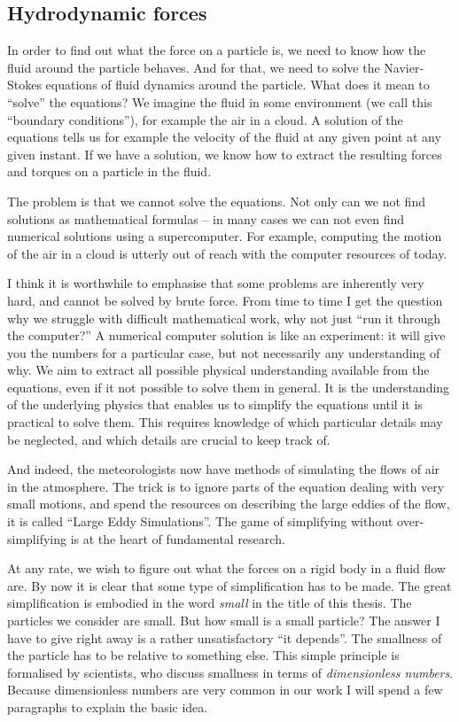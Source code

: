 \documentclass[thesis.tex]{subfiles}
\begin{document}
\subsection*{Hydrodynamic forces}

In order to find out what the force on a particle is, we need to know how the fluid around the particle behaves. And for that, we need to solve the Navier-Stokes equations of fluid dynamics around the particle. What does it mean to ``solve'' the equations? We imagine the fluid in some environment (we call this ``boundary conditions''), for example the air in a cloud. A solution of the equations tells us for example the velocity of the fluid at any given point at any given instant. If we have a solution, we know how to extract the resulting forces and torques on a particle in the fluid.

The problem is that we cannot solve the equations. Not only can we not find solutions as mathematical formulas -- in many cases we can not even find numerical solutions using a supercomputer. For example, computing the motion of the air in a cloud is utterly out of reach with the computer resources of today.

I think it is worthwhile to emphasise that some problems are inherently very hard, and cannot be solved by brute force. From time to time I get the question why we struggle with difficult mathematical work, why not just ``run it through the computer?'' A numerical computer solution is like an experiment: it will give you the numbers for a particular case, but not necessarily any understanding of why. We aim to extract all possible physical understanding available from the equations, even if it not possible to solve them in general. It is the understanding of the underlying physics that enables us to simplify the equations until it is practical to solve them. This requires knowledge of which particular details may be neglected, and which details are crucial to keep track of. 

And indeed, the meteorologists now have methods of simulating the flows of air in the atmosphere. The trick is to ignore parts of the equation dealing with very small motions, and spend the resources on describing the large eddies of the flow, it is called ``Large Eddy Simulations''. The game of simplifying without over-simplifying is at the heart of fundamental research.

At any rate, we wish to figure out what the forces on a rigid body in a fluid flow are. By now it is clear that some type of simplification has to be made. The great simplification is embodied in the word \emph{small} in the title of this thesis. The particles we consider are small. But how small is a small particle? The answer I have to give right away is a rather unsatisfactory ``it depends''. The smallness of the particle has to be relative to something else. This simple principle is formalised by scientists, who discuss smallness in terms of \emph{dimensionless numbers}. Because dimensionless numbers are very common in our work I will spend a few paragraphs to explain the basic idea.
\end{document}
